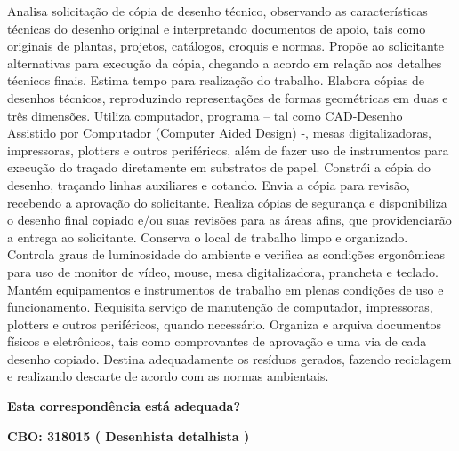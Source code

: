 \documentclass[
]{article}
\begin{document}
Analisa solicitação de cópia de desenho técnico, observando as
características técnicas do desenho original e interpretando documentos
de apoio, tais como originais de plantas, projetos, catálogos, croquis e
normas. Propõe ao solicitante alternativas para execução da cópia,
chegando a acordo em relação aos detalhes técnicos finais. Estima tempo
para realização do trabalho. Elabora cópias de desenhos técnicos,
reproduzindo representações de formas geométricas em duas e três
dimensões. Utiliza computador, programa -- tal como CAD-Desenho
Assistido por Computador (Computer Aided Design) -, mesas
digitalizadoras, impressoras, plotters e outros periféricos, além de
fazer uso de instrumentos para execução do traçado diretamente em
substratos de papel. Constrói a cópia do desenho, traçando linhas
auxiliares e cotando. Envia a cópia para revisão, recebendo a aprovação
do solicitante. Realiza cópias de segurança e disponibiliza o desenho
final copiado e/ou suas revisões para as áreas afins, que providenciarão
a entrega ao solicitante. Conserva o local de trabalho limpo e
organizado. Controla graus de luminosidade do ambiente e verifica as
condições ergonômicas para uso de monitor de vídeo, mouse, mesa
digitalizadora, prancheta e teclado. Mantém equipamentos e instrumentos
de trabalho em plenas condições de uso e funcionamento. Requisita
serviço de manutenção de computador, impressoras, plotters e outros
periféricos, quando necessário. Organiza e arquiva documentos físicos e
eletrônicos, tais como comprovantes de aprovação e uma via de cada
desenho copiado. Destina adequadamente os resíduos gerados, fazendo
reciclagem e realizando descarte de acordo com as normas ambientais.

\begin{Form}
\textbf{Esta correspondência está adequada?} \\ 
\end{Form}

\textbf{CBO: 318015  ( Desenhista detalhista )}
\end{document}
